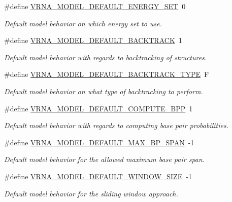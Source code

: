 \begin{DoxyCompactItemize}
\#define \hyperlink{group__model__details_ga6fcf6b2d0f89256cdbd166486c9b6e1e}{V\+R\+N\+A\+\_\+\+M\+O\+D\+E\+L\+\_\+\+D\+E\+F\+A\+U\+L\+T\+\_\+\+E\+N\+E\+R\+G\+Y\+\_\+\+S\+E\+T}~0
\begin{DoxyCompactList}\small\item\em Default model behavior on which energy set to use. \end{DoxyCompactList}\item 
\#define \hyperlink{group__model__details_ga3fda8006ab84baf817bd8e5ccbc6bb35}{V\+R\+N\+A\+\_\+\+M\+O\+D\+E\+L\+\_\+\+D\+E\+F\+A\+U\+L\+T\+\_\+\+B\+A\+C\+K\+T\+R\+A\+C\+K}~1
\begin{DoxyCompactList}\small\item\em Default model behavior with regards to backtracking of structures. \end{DoxyCompactList}\item 
\#define \hyperlink{group__model__details_gad0e81fcaca53c4a826c68e0796de2afb}{V\+R\+N\+A\+\_\+\+M\+O\+D\+E\+L\+\_\+\+D\+E\+F\+A\+U\+L\+T\+\_\+\+B\+A\+C\+K\+T\+R\+A\+C\+K\+\_\+\+T\+Y\+P\+E}~\textquotesingle{}F\textquotesingle{}
\begin{DoxyCompactList}\small\item\em Default model behavior on what type of backtracking to perform. \end{DoxyCompactList}\item 
\#define \hyperlink{group__model__details_ga1d6cd5051940b126c248147c011bac6c}{V\+R\+N\+A\+\_\+\+M\+O\+D\+E\+L\+\_\+\+D\+E\+F\+A\+U\+L\+T\+\_\+\+C\+O\+M\+P\+U\+T\+E\+\_\+\+B\+P\+P}~1
\begin{DoxyCompactList}\small\item\em Default model behavior with regards to computing base pair probabilities. \end{DoxyCompactList}\item 
\#define \hyperlink{group__model__details_ga7cb6f4ae8fdebff6746a4410814f2977}{V\+R\+N\+A\+\_\+\+M\+O\+D\+E\+L\+\_\+\+D\+E\+F\+A\+U\+L\+T\+\_\+\+M\+A\+X\+\_\+\+B\+P\+\_\+\+S\+P\+A\+N}~-\/1
\begin{DoxyCompactList}\small\item\em Default model behavior for the allowed maximum base pair span. \end{DoxyCompactList}\item 
\#define \hyperlink{group__model__details_ga8de04a9cb57e811e313b0f9f207f6bdb}{V\+R\+N\+A\+\_\+\+M\+O\+D\+E\+L\+\_\+\+D\+E\+F\+A\+U\+L\+T\+\_\+\+W\+I\+N\+D\+O\+W\+\_\+\+S\+I\+Z\+E}~-\/1
\begin{DoxyCompactList}\small\item\em Default model behavior for the sliding window approach. \end{DoxyCompactList}\item 

\end{DoxyCompactItemize}
